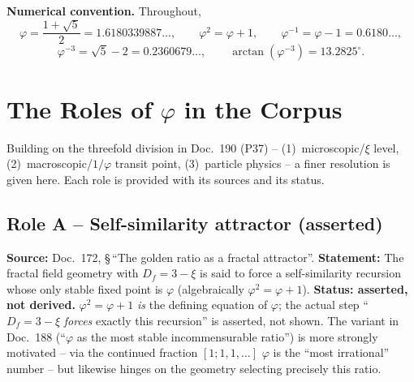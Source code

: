 \noindent\textbf{Numerical convention.} Throughout,
\begin{equation}
  \varphi = \frac{1+\sqrt5}{2} = 1.6180339887\ldots, \qquad
  \varphi^2 = \varphi + 1, \qquad
  \varphi^{-1} = \varphi - 1 = 0.6180\ldots,
\end{equation}
\begin{equation}
  \varphi^{-3} = \sqrt5 - 2 = 0.2360679\ldots, \qquad
  \arctan(\varphi^{-3}) = 13.2825^\circ .
\end{equation}

\section{The Roles of $\varphi$ in the Corpus}

Building on the threefold division in Doc.~190 (P37) -- (1)~microscopic/$\xi$
level, (2)~macroscopic/$1/\varphi$ transit point, (3)~particle physics -- a
finer resolution is given here. Each role is provided with its sources and its
status.

\subsection{Role A -- Self-similarity attractor (asserted)}
\textbf{Source:} Doc.~172, \S\,``The golden ratio as a fractal attractor''.
\textbf{Statement:} The fractal field geometry with $D_f=3-\xi$ is said to
force a self-similarity recursion whose only stable fixed point is $\varphi$
(algebraically $\varphi^2=\varphi+1$).
\textbf{Status: asserted, not derived.} $\varphi^2=\varphi+1$ \emph{is} the
defining equation of $\varphi$; the actual step ``$D_f=3-\xi$ \emph{forces}
exactly this recursion'' is asserted, not shown. The variant in Doc.~188
(``$\varphi$ as the most stable incommensurable ratio'') is more strongly
motivated -- via the continued fraction $[1;1,1,\dots]$ $\varphi$ is the ``most
irrational'' number -- but likewise hinges on the geometry selecting precisely
this ratio.

